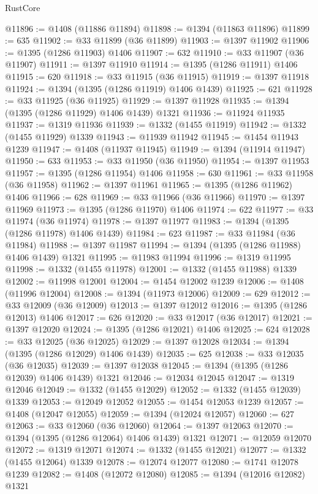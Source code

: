 \begin{lexlean}{RustCore}
\begin{coremodule}
@11896 := @1408 (@11886 @11894)
@11898 := @1394 (@11863 @11896)
@11899 := 635
@11902 := @33 @11899 (@36 @11899)
@11903 := @1397 @11902
@11906 := @1395 (@1286 @11903) @1406
@11907 := 632
@11910 := @33 @11907 (@36 @11907)
@11911 := @1397 @11910
@11914 := @1395 (@1286 @11911) @1406
@11915 := 620
@11918 := @33 @11915 (@36 @11915)
@11919 := @1397 @11918
@11924 := @1394 (@1395 (@1286 @11919) @1406 @1439)
@11925 := 621
@11928 := @33 @11925 (@36 @11925)
@11929 := @1397 @11928
@11935 := @1394 (@1395 (@1286 @11929) @1406 @1439) @1321
@11936 := @11924 @11935
@11937 := @1319 @11936
@11939 := @1332 (@1455 @11919)
@11942 := @1332 (@1455 @11929) @1339
@11943 := @11939 @11942
@11945 := @1454 @11943 @1239
@11947 := @1408 (@11937 @11945)
@11949 := @1394 (@11914 @11947)
@11950 := 633
@11953 := @33 @11950 (@36 @11950)
@11954 := @1397 @11953
@11957 := @1395 (@1286 @11954) @1406
@11958 := 630
@11961 := @33 @11958 (@36 @11958)
@11962 := @1397 @11961
@11965 := @1395 (@1286 @11962) @1406
@11966 := 628
@11969 := @33 @11966 (@36 @11966)
@11970 := @1397 @11969
@11973 := @1395 (@1286 @11970) @1406
@11974 := 622
@11977 := @33 @11974 (@36 @11974)
@11978 := @1397 @11977
@11983 := @1394 (@1395 (@1286 @11978) @1406 @1439)
@11984 := 623
@11987 := @33 @11984 (@36 @11984)
@11988 := @1397 @11987
@11994 := @1394 (@1395 (@1286 @11988) @1406 @1439) @1321
@11995 := @11983 @11994
@11996 := @1319 @11995
@11998 := @1332 (@1455 @11978)
@12001 := @1332 (@1455 @11988) @1339
@12002 := @11998 @12001
@12004 := @1454 @12002 @1239
@12006 := @1408 (@11996 @12004)
@12008 := @1394 (@11973 @12006)
@12009 := 629
@12012 := @33 @12009 (@36 @12009)
@12013 := @1397 @12012
@12016 := @1395 (@1286 @12013) @1406
@12017 := 626
@12020 := @33 @12017 (@36 @12017)
@12021 := @1397 @12020
@12024 := @1395 (@1286 @12021) @1406
@12025 := 624
@12028 := @33 @12025 (@36 @12025)
@12029 := @1397 @12028
@12034 := @1394 (@1395 (@1286 @12029) @1406 @1439)
@12035 := 625
@12038 := @33 @12035 (@36 @12035)
@12039 := @1397 @12038
@12045 := @1394 (@1395 (@1286 @12039) @1406 @1439) @1321
@12046 := @12034 @12045
@12047 := @1319 @12046
@12049 := @1332 (@1455 @12029)
@12052 := @1332 (@1455 @12039) @1339
@12053 := @12049 @12052
@12055 := @1454 @12053 @1239
@12057 := @1408 (@12047 @12055)
@12059 := @1394 (@12024 @12057)
@12060 := 627
@12063 := @33 @12060 (@36 @12060)
@12064 := @1397 @12063
@12070 := @1394 (@1395 (@1286 @12064) @1406 @1439) @1321
@12071 := @12059 @12070
@12072 := @1319 @12071
@12074 := @1332 (@1455 @12021)
@12077 := @1332 (@1455 @12064) @1339
@12078 := @12074 @12077
@12080 := @1741 @12078 @1239
@12082 := @1408 (@12072 @12080)
@12085 := @1394 (@12016 @12082) @1321

\end{coremodule}
\end{lexlean}
